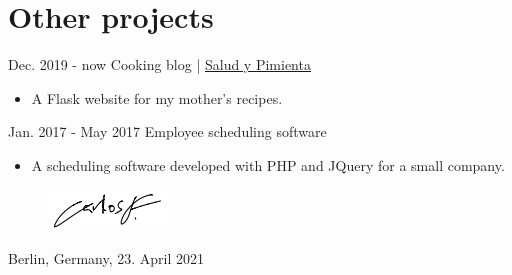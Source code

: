 \documentclass[]{commands}
\begin{document}
\section{Other projects}
\begin{entrylist}
 
   \entry
    {Dec. 2019 - now}
    {Cooking blog | }
    {\href{https://www.saludypimienta.com/}{\small Salud y Pimienta \faMousePointer}}
    {}
    {\jobspace
    \begin{itemize}[leftmargin=*, itemsep = 0.1em]
        \item A Flask website for my mother's recipes.\\
    \end{itemize}}
    
   \entry
    {Jan. 2017 - May 2017}
    {Employee scheduling software}
    {}
    {}
    {\jobspace
    \begin{itemize}[leftmargin=*, itemsep = 0.1em]
        \item A scheduling software developed with PHP and JQuery for a small company.\\
    \end{itemize}}
    \vspace{-4mm}
\end{entrylist}

\begin{figure}[H]
\hspace{11cm}
\includegraphics{img/signature.png}
\end{figure}
\vspace{-0.8cm}
\hspace{8.5cm} Berlin, Germany, 23. April 2021
\end{document}
